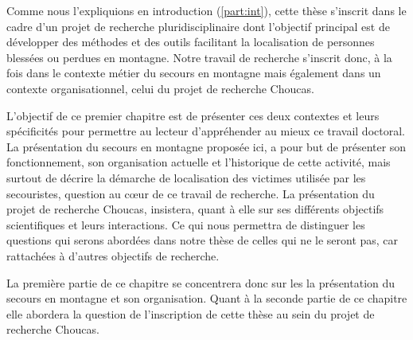 Comme nous l'expliquions en introduction (\autoref{part:int}), cette
thèse s'inscrit dans le cadre d'un projet de recherche
pluridisciplinaire dont l'objectif principal est de développer des
méthodes et des outils facilitant la localisation de personnes
blessées ou perdues en montagne. Notre travail de recherche s'inscrit
donc, à la fois dans le contexte métier du secours en montagne mais
également dans un contexte organisationnel, celui du projet de
recherche Choucas.

L'objectif de ce premier chapitre est de présenter ces deux contextes
et leurs spécificités pour permettre au lecteur d'appréhender au mieux
ce travail doctoral. La présentation du secours en montagne proposée
ici, a pour but de présenter son fonctionnement, son organisation
actuelle et l'historique de cette activité, mais surtout de décrire la
démarche de localisation des victimes utilisée par les secouristes,
question au cœur de ce travail de recherche. La présentation du projet
de recherche Choucas, insistera, quant à elle sur ses différents
objectifs scientifiques et leurs interactions. Ce qui nous permettra
de distinguer les questions qui serons abordées dans notre thèse de
celles qui ne le seront pas, car rattachées à d'autres objectifs de
recherche.

La première partie de ce chapitre se concentrera donc sur les la
présentation du secours en montagne et son organisation. Quant à la
seconde partie de ce chapitre elle abordera la question de
l'inscription de cette thèse au sein du projet de recherche Choucas.

